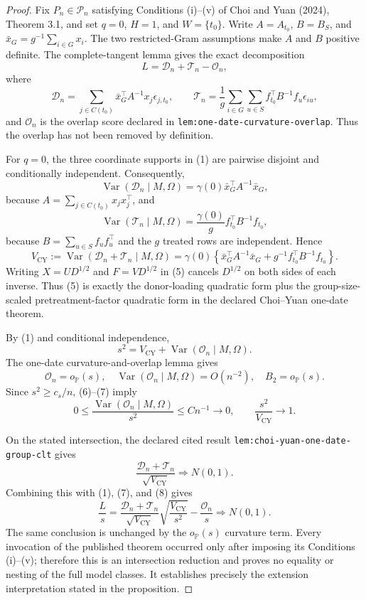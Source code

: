 \documentclass{article}
\begin{document}
\begin{proof}
Fix \(P_n\in\mathcal P_n\) satisfying Conditions (i)--(v) of Choi and Yuan (2024), Theorem 3.1, and set \(q=0\), \(H=1\), and \(W=\{t_0\}\).  Write \(A=A_{t_0}\), \(B=B_S\), and \(\bar x_G=g^{-1}\sum_{i\in G}x_i\).  The two restricted-Gram assumptions make \(A\) and \(B\) positive definite.  The complete-tangent lemma gives the exact decomposition
\[
 L=\mathcal D_n+\mathcal T_n-\mathcal O_n,
 \tag{1}
\]
where
\[
 \mathcal D_n=\sum_{j\in C(t_0)}\bar x_G^{\top}A^{-1}x_j\epsilon_{j,t_0},
 \qquad
 \mathcal T_n=\frac1g\sum_{i\in G}\sum_{u\in S}
 f_{t_0}^{\top}B^{-1}f_u\epsilon_{iu},
 \tag{2}
\]
and \(\mathcal O_n\) is the overlap score declared in \texttt{lem:one-date-curvature-overlap}.  Thus the overlap has not been removed by definition.

For \(q=0\), the three coordinate supports in (1) are pairwise disjoint and conditionally independent.  Consequently,
\[
 \operatorname{Var}(\mathcal D_n\mid M,\Omega)
 =\gamma(0)\bar x_G^{\top}A^{-1}\bar x_G,
 \tag{3}
\]
because \(A=\sum_{j\in C(t_0)}x_jx_j^{\top}\), and
\[
 \operatorname{Var}(\mathcal T_n\mid M,\Omega)
 =\frac{\gamma(0)}g f_{t_0}^{\top}B^{-1}f_{t_0},
 \tag{4}
\]
because \(B=\sum_{u\in S}f_uf_u^{\top}\) and the \(g\) treated rows are independent.  Hence
\[
 V_{\mathrm{CY}}:=\operatorname{Var}(\mathcal D_n+\mathcal T_n\mid M,\Omega)
 =\gamma(0)\left\{\bar x_G^{\top}A^{-1}\bar x_G
 +g^{-1}f_{t_0}^{\top}B^{-1}f_{t_0}\right\}.
 \tag{5}
\]
Writing \(X=UD^{1/2}\) and \(F=VD^{1/2}\) in (5) cancels \(D^{1/2}\) on both sides of each inverse.  Thus (5) is exactly the donor-loading quadratic form plus the group-size-scaled pretreatment-factor quadratic form in the declared Choi--Yuan one-date theorem.

By (1) and conditional independence,
\[
 s^2=V_{\mathrm{CY}}+\operatorname{Var}(\mathcal O_n\mid M,\Omega).
 \tag{6}
\]
The one-date curvature-and-overlap lemma gives
\[
 \mathcal O_n=o_{\mathbb P}(s),
 \quad
 \operatorname{Var}(\mathcal O_n\mid M,\Omega)=O(n^{-2}),
 \quad B_2=o_{\mathbb P}(s).
 \tag{7}
\]
Since \(s^2\ge c_s/n\), (6)--(7) imply
\[
 0\le\frac{\operatorname{Var}(\mathcal O_n\mid M,\Omega)}{s^2}
 \le Cn^{-1}\to0,
 \qquad
 \frac{s^2}{V_{\mathrm{CY}}}\to1.
 \tag{8}
\]

On the stated intersection, the declared cited result \texttt{lem:choi-yuan-one-date-group-clt} gives
\[
 \frac{\mathcal D_n+\mathcal T_n}{\sqrt{V_{\mathrm{CY}}}}
 \Rightarrow N(0,1).
\]
Combining this with (1), (7), and (8) gives
\[
 \frac Ls
 =\frac{\mathcal D_n+\mathcal T_n}{\sqrt{V_{\mathrm{CY}}}}
   \sqrt{\frac{V_{\mathrm{CY}}}{s^2}}
  -\frac{\mathcal O_n}{s}
 \Rightarrow N(0,1).
\]
The same conclusion is unchanged by the \(o_{\mathbb P}(s)\) curvature term.  Every invocation of the published theorem occurred only after imposing its Conditions (i)--(v); therefore this is an intersection reduction and proves no equality or nesting of the full model classes.  It establishes precisely the extension interpretation stated in the proposition.
\end{proof}
\end{document}
